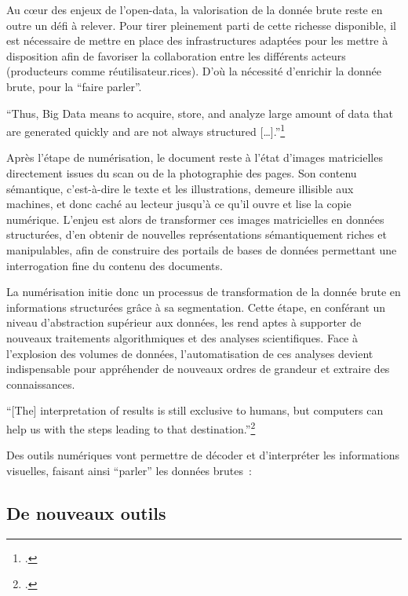 Au cœur des enjeux de l'open-data, la valorisation de la donnée brute reste en outre un défi à relever. Pour tirer pleinement parti de cette richesse disponible, il est nécessaire de mettre en place des infrastructures adaptées pour les mettre à disposition afin de favoriser la collaboration entre les différents acteurs (producteurs comme réutilisateur.rices). D'où la nécessité d'enrichir la donnée brute, pour la ``faire parler''. 

\begin{kwote}
``Thus, Big Data means to acquire, store, and analyze large amount of data that are generated quickly and are not always structured {[}\ldots{]}.''\footcite[p.26]{klinke_big_2016}
\end{kwote}

Après l'étape de numérisation, le document reste à l'état d'images matricielles directement issues du scan ou de la photographie des pages. Son contenu sémantique, c'est-à-dire le texte et les illustrations, demeure illisible aux machines, et donc caché au lecteur jusqu'à ce qu'il ouvre et lise la copie numérique. L'enjeu est alors de transformer ces images matricielles en données structurées, d'en obtenir de nouvelles représentations sémantiquement riches et manipulables, afin de construire des portails de bases de données permettant une interrogation fine du contenu des documents. 

La numérisation initie donc un processus de transformation de la donnée brute en informations structurées grâce à sa segmentation. Cette étape, en conférant un niveau d'abstraction supérieur aux données, les rend aptes à supporter de nouveaux traitements algorithmiques et des analyses scientifiques. Face à l'explosion des volumes de données, l'automatisation de ces analyses devient indispensable pour appréhender de nouveaux ordres de grandeur et extraire des connaissances.

\begin{kwote}
``[The] interpretation of results is still exclusive to humans, but computers can help us with the steps leading to that destination.''\footcite[p.26]{klinke_big_2016}
\end{kwote}

Des outils numériques vont permettre de décoder et d'interpréter les informations visuelles, faisant ainsi ``parler'' les données brutes~:

\subsection{De nouveaux outils}

